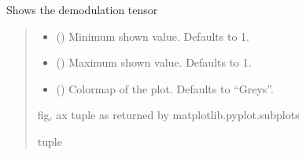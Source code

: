 \documentclass[letterpaper,10pt,english]{sphinxmanual}
\begin{document}
\begin{fulllineitems}

\begin{fulllineitems}
\label{\detokenize{micropolarray.processing:micropolarray.processing.demodulation.Demodulator.show}}
\pysigstartsignatures
{}
\pysigstopsignatures
\sphinxAtStartPar
Shows the demodulation tensor
\begin{quote}\begin{description}
\begin{itemize}
\item {} 
\sphinxAtStartPar
{} (\sphinxstyleliteralemphasis{\sphinxupquote{, }}) \textendash{} Minimum shown value. Defaults to \sphinxhyphen{}1.

\item {} 
\sphinxAtStartPar
{} (\sphinxstyleliteralemphasis{\sphinxupquote{, }}) \textendash{} Maximum shown value. Defaults to 1.

\item {} 
\sphinxAtStartPar
{} (\sphinxstyleliteralemphasis{\sphinxupquote{, }}) \textendash{} Colormap of the plot. Defaults to “Greys”.

\end{itemize}

\sphinxAtStartPar
fig, ax tuple as returned by matplotlib.pyplot.subplots

\sphinxAtStartPar
tuple

\end{description}\end{quote}

\end{fulllineitems}


\end{fulllineitems}
\end{document}
